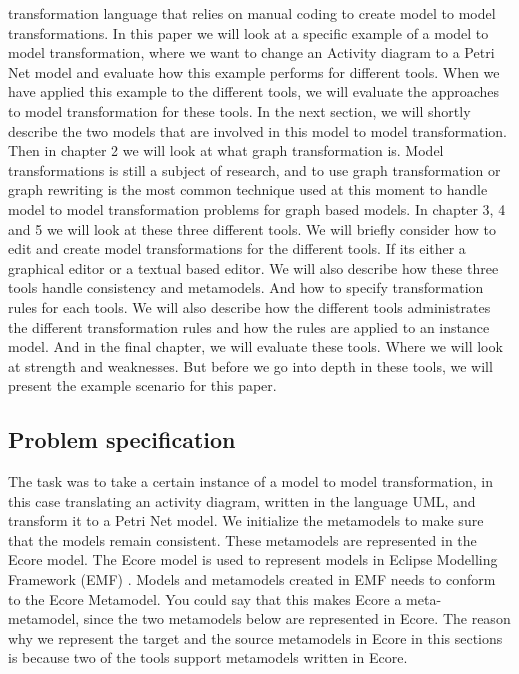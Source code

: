 \documentclass[pdftex,11pt,a4paper]{article}
\begin{document}
transformation language that relies on manual coding to create model to model
transformations. In this paper we will look at a specific example of a model to
model transformation, where we want to change an Activity diagram
to a Petri Net model and evaluate how this example performs for different
tools. When we have applied this example to the different tools, we will
evaluate the approaches to model transformation for these tools. In the next
section, we will shortly describe the two models that are involved in this
model to model transformation. Then in chapter 2 we will look at what graph
transformation is. Model transformations is still a subject of research, and to
use graph transformation or graph rewriting is the most common technique used at
this moment to handle model to model transformation problems for graph based
models. In chapter 3, 4 and 5 we will look at these three different tools.
We will briefly consider how to edit and create model transformations for the
different tools. If its either a graphical editor or a textual based editor. We
will also describe how these three tools handle consistency and metamodels. And
how to specify transformation rules for each tools. We will also describe how
the different tools administrates the different transformation rules and how
the rules are applied to an instance model. And in the final chapter, we will
evaluate these tools. Where we will look at strength and weaknesses. But before
we go into depth in these tools, we will present the example scenario for this
paper.

\subsection{Problem specification}
\noindent The task was to take a certain instance of a model to model
transformation, in this case translating an activity diagram, written in the
language UML, and transform it to a Petri Net model. We initialize the
metamodels to make sure that the models remain consistent. These metamodels are
represented in the Ecore model\cite{Steinberg2009}. The Ecore model is used to
represent models in Eclipse Modelling Framework (EMF) \cite{Steinberg2009}.
Models and metamodels created in EMF needs to conform to the Ecore Metamodel.
You could say that this makes Ecore a meta-metamodel, since the two metamodels
below are represented in Ecore. The reason why we represent the target and the
source metamodels in Ecore in this sections is because two of the tools support
metamodels written in Ecore.
\end{document}
